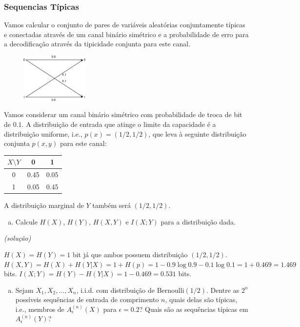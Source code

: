 \begin{frame}[allowframebreaks]
  \frametitle{Sequencias Típicas}
  \begin{exercise}
  Vamos calcular o conjunto de pares de variáveis aleatórias conjuntamente típicas e conectadas 
  através de um canal binário simétrico e a probabilidade de erro para a decodificação 
  através da tipicidade conjunta para este canal.

  \begin{figure}[h!]
  \centering
  \includegraphics[width=0.3\textwidth]{images/ex715channel.pdf}
  \label{fig:ex715channel}
  \end{figure}

  \examplebreak
  Vamos considerar um canal binário simétrico com probabilidade de troca de bit de $0.1$.
  A distribuição de entrada que atinge o limite da capacidade é a distribuição uniforme,
  i.e., $p(x) = (1/2, 1/2)$, que leva à seguinte distribuição conjunta $p(x,y)$ para
  este canal:

  \begin{tabular}{c|cc}
  $X \setminus Y$ & 0 & 1 \\ \hline
  0  & 0.45 & 0.05 \\
  1  & 0.05 & 0.45
  \end{tabular}

  A distribuição marginal de $Y$ também será $(1/2, 1/2)$.

  \examplebreak
  \begin{enumerate}[a)]
  \item Calcule $H(X)$, $H(Y)$, $H(X,Y)$ e $I(X;Y)$ para a distribuição dada.
  \end{enumerate}
 
  \textit{(solução)}

  $H(X) = H(Y) = 1$ bit já que ambos possuem distribuição $(1/2, 1/2)$.
  $H(X,Y) = H(X) + H(Y|X) = 1 + H(p) = 1 - 0.9 \log 0.9 - 0.1 \log 0.1 = 1 + 0.469 = 1.469$ bits.
  $I(X;Y) = H(Y) - H(Y|X) = 1 - 0.469 = 0.531$ bits.
 

  \examplebreak
  \begin{enumerate}[b)]
  \item Sejam $X_1, X_2, \ldots, X_n$, i.i.d. com distribuição de Bernoulli$(1/2)$.
  Dentre as $2^n$ possíveis sequências de entrada de comprimento $n$, quais delas são típicas,
  i.e., membros de $A_\epsilon^{(n)}(X)$ para $\epsilon = 0.2$? Quais são as sequências
  típicas em $A_\epsilon^{(n)}(Y)$?
  \end{enumerate}
  

\end{exercise}
\end{frame}
